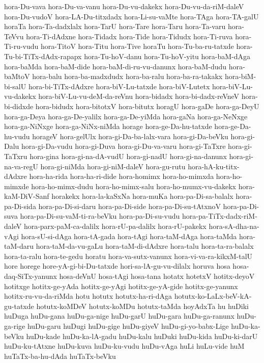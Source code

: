 {hora-Du-vava
hora-Du-va-vanu
hora-Du-vu-dakekx
hora-Du-vu-da-riM-daleV
hora-Du-vudoV
hora-LA-Du-titxdadx
hora-Li-su-vaMte
hora-TAga
hora-TA-galU
horaTa
hora-Ta-dadxlalx
hora-TarU
hora-Tare
hora-Taru
hora-Ta-varu
hora-TeVvu
hora-Ti-dAdxne
hora-Tidadx
hora-Tide
hora-Tidudx
hora-Ti-ruva
hora-Ti-ru-vudu
hora-TitoV
hora-Titu
hora-Tive
horaTu
hora-Tu-ba-ru-tatxde
hora-Tu-bi-TiTx-dAdx-rapapx
hora-Tu-hoV-danu
hora-Tu-hoV-yitu
hora-baM-dAga
hora-baMda
hora-baM-dide
hora-baM-di-ru-vu-danunx
hora-baM-dudu
hora-baMtoV
hora-balu
hora-ba-madxdudx
hora-ba-ralu
hora-ba-ra-takakx
hora-biM-bi-salU
hora-bi-TiTx-dAdxre
hora-biV-Lu-tatxde
hora-biV-Lutetx
hora-biV-Lu-vu-dakekx
hora-biV-Lu-vu-deM-da-reVnu
hora-bidadx
hora-bi-dadx-reVneV
hora-bi-didxde
hora-bidudx
hora-bitotxV
hora-bitutx
horagU
hora-gaDe
hora-ga-DeyU
hora-ga-Deya
hora-ga-De-yalilx
hora-ga-De-yiMda
hora-gaNa
hora-ga-NeNxge
hora-ga-NiNxge
hora-ga-NiNx-niMda
horage
hora-ge-Da-hu-tatxde
hora-ge-Da-hu-vudu
horageV
hora-gelUlx
hora-gi-Da-ba-lalx-vara
hora-gi-Da-beVku
hora-gi-Dalu
hora-gi-Da-vudu
hora-gi-Duva
hora-gi-Du-va-varu
hora-gi-TaTxre
hora-gi-TaTxru
hora-gina
hora-gi-na-dA-vudU
hora-gi-nadU
hora-gi-na-danunx
hora-gi-na-va-regU
hora-gi-niMda
hora-gi-niM-daleV
hora-gu-rutu
hora-hA-ku-titx-dAdxre
hora-ha-rida
hora-ha-ri-dide
hora-homimx
hora-ho-mimxda
hora-ho-mimxde
hora-ho-mimx-dudu
hora-ho-mimx-salu
hora-ho-mumx-vu-dakekx
hora-kaM-DiV-Sanf
horakekx
hora-la-kaSxNa
hora-muKa
hora-pa-Di-sa-balalx
hora-pa-Di-sida
hora-pa-Di-si-daru
hora-pa-Di-side
hora-pa-Di-su-tAtxnoV
hora-pa-Di-suva
hora-pa-Di-su-vaM-ti-ra-beVku
hora-pa-Di-su-vudu
hora-pa-TiTx-dadx-riM-daleV
hora-parx-paM-ca-dalilx
hora-rU-pa-dalilx
hora-rU-pakekx
hora-sA-dha-na-vAgi
hora-sU-si-dAga
hora-tA-gada
hora-tAgi
hora-taM-dAga
hora-taMda
hora-taM-daru
hora-taM-da-vu-gaLu
hora-taM-di-dAdxre
hora-talu
hora-ta-ra-balalx
hora-ta-ralu
hora-te-gedu
horatu
hora-va-sutx-vanunx
hora-vi-va-ra-kikxM-talU
hore
horege
hore-yA-gi-bi-Du-tatxde
hori-sa-lA-gu-vu-dilalx
horuva
hosa
hosa-daq-SiTx-yanunx
hosa-deVnU
hosa-tAgi
hosa-tana
hotatx
hotetxV
hotitx-deyoV
hotitxge
hotitx-ge-yAda
hotitx-ge-yAgi
hotitx-ge-yA-gide
hotitx-ge-yanunx
hotitx-ru-vu-da-riMda
hotu
hotutx
hotutx-ha-ri-dAga
hotutx-ko-LaLx-beV-kA-gu-tatxde
hotutx-koMDeV
hotutx-koMDu
hotutx-taMda
hoyAdxTa
hu
huDiki
huDuga
huDu-gana
huDu-ga-nige
huDu-garU
huDu-gara
huDu-ga-ranunx
huDu-ga-rige
huDu-garu
huDugi
huDu-gige
huDu-giyeV
huDu-gi-yo-babx-Lige
huDu-ka-beVku
huDu-kade
huDu-ka-lA-gadu
huDu-kalu
huDuki
huDu-kida
huDu-ki-darU
huDu-ku-tAtxne
huDu-kuva
huDu-ku-vudu
huDu-vAga
huLi
huLu-vide
huM
huTaTx-ba-hu-dAda
huTaTx-beVku
}
